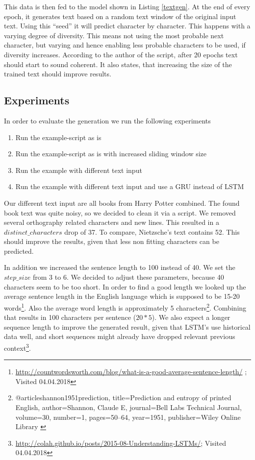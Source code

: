 \documentclass{article}[]
\begin{document}
This data is then fed to the model shown in Listing \ref{textgen}.
At the end of every epoch, it generates text based on a random text window of the original input text.
Using this \enquote{seed} it will predict character by character.
This happens with a varying degree of diversity.
This means not using the most probable next character, but varying and hence enabling less probable characters to be used, if diversity increases.
According to the author of the script, after 20 epochs text should start to sound coherent.
It also states, that increasing the size of the trained text should improve results.

\subsection{Experiments}
In order to evaluate the generation we run the following experiments
\begin{enumerate}
\item{Run the example-script as is}
\item{Run the example-script as is with increased sliding window size}
\item{Run the example with different text input}
\item{Run the example with different text input and use a GRU instead of LSTM}
\end{enumerate}

Our different text input are all books from Harry Potter combined.
The found book text was quite noisy, so we decided to clean it via a script.
We removed several orthography related characters and new lines.
This resulted in a $distinct\_characters$ drop of 37.
To compare, Nietzsche's text contains 52.
This should improve the results, given that less non fitting characters can be predicted.

In addition we increased the sentence length to 100 instead of 40.
We set the $step\_size$ from 3 to 6.
We decided to adjust these parameters, because 40 characters seem to be too short.
In order to find a good length we looked up the average sentence length in the English language which is supposed to be 15-20 words\footnote{\url{http://countwordsworth.com/blog/what-is-a-good-average-sentence-length/} ; Visited 04.04.2018}.
Also the average word length is approximately 5 characters\footnote{@article{shannon1951prediction,
title={Prediction and entropy of printed English},
author={Shannon, Claude E},
journal={Bell Labs Technical Journal},
volume={30},
number={1},
pages={50--64},
year={1951},
publisher={Wiley Online Library}
}}.
Combining that results in 100 characters per sentence ($20 * 5$).
We also expect a longer sequence length to improve the generated result, given that LSTM's use historical data well, and short sequences might already have dropped relevant previous context\footnote{\url{http://colah.github.io/posts/2015-08-Understanding-LSTMs/}; Visited 04.04.2018}.
\end{document}
